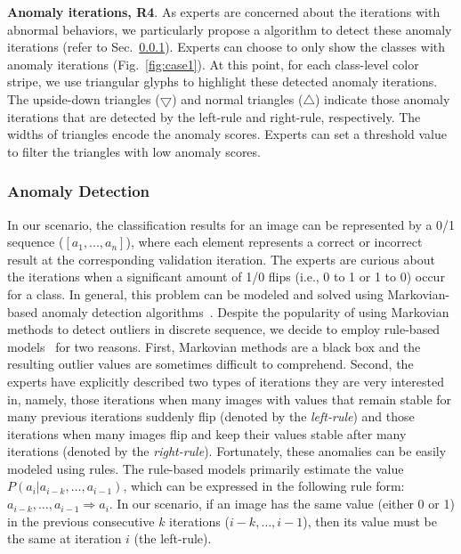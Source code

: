 \documentclass[format=acmsmall, review=false, screen=true]{acmart}
\newcommand{\ti}{\textcolor[rgb]{0,0,0}}
\begin{document}
\textbf{Anomaly iterations, R4}. \ti{As experts are concerned about the iterations with abnormal behaviors, we particularly propose a algorithm to detect these anomaly iterations (refer to Sec.~\ref{sec:anomaly}).
Experts can choose to only show the classes with anomaly iterations (Fig.~\ref{fig:case1}).
At this point, for each class-level color stripe, we use triangular glyphs to highlight these detected anomaly iterations.
The upside-down triangles ($\bigtriangledown$) and normal triangles ($\triangle$) indicate those anomaly iterations that are detected by the left-rule and right-rule, respectively.
The widths of triangles encode the anomaly scores.
Experts can set a threshold value to filter the triangles with low anomaly scores.}\subsubsection{Anomaly Detection}\label{sec:anomaly}%
In our scenario, the classification results for an image can be represented by a 0/1 sequence ($[a_1, ..., a_n]$), where each element represents a correct or incorrect result at the corresponding validation iteration.
The experts are curious about the iterations when a significant amount of 1/0 flips (i.e., 0 to 1 or 1 to 0) occur for a class.
In general, this problem can be modeled and solved using Markovian-based anomaly detection algorithms~\cite{aggarwal2015outlier}.
Despite the popularity of using Markovian methods to detect outliers in discrete sequence, we decide to employ rule-based models~\cite{aggarwal2015outlier} for two reasons.
First, Markovian methods are a black box and the resulting outlier values are sometimes difficult to comprehend. Second, the experts have explicitly described two types of iterations they are very interested in, namely, those iterations when many images with values that remain stable for many previous iterations suddenly flip (denoted by the \textit{left-rule}) and those iterations when many images flip and keep their values stable after many iterations (denoted by the \textit{right-rule}).
Fortunately, these anomalies can be easily modeled using rules.
The rule-based models primarily estimate the value $P(a_i|a_{i-k},\ldots,a_{i-1})$, which can be expressed in the following rule form: $ a_{i-k},\ldots,a_{i-1} \Rightarrow a_{i}.$
In our scenario, if an image has the same value (either 0 or 1) in the previous consecutive $k$ iterations ($i-k,\ldots, i-1$), then its value must be the same at iteration $i$ (the left-rule).
\end{document}
